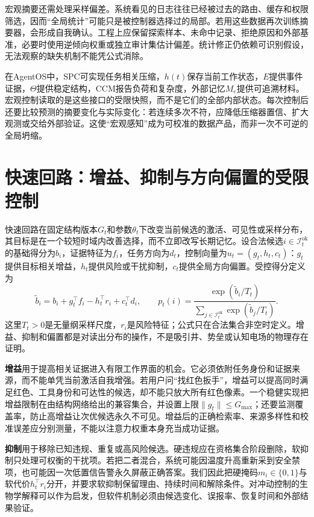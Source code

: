 宏观摘要还需处理采样偏差。系统看见的日志往往已经被过去的路由、缓存和权限筛选，因而“全局统计”可能只是被控制器选择过的局部。若用这些数据再次训练摘要器，会形成自我确认。工程上应保留探索样本、未命中记录、拒绝原因和外部基准，必要时使用逆倾向权重或独立审计集估计偏差。统计修正仍依赖可识别假设，无法观察的缺失机制不能凭公式消除。

在AgentOS中，SPC可实现任务相关压缩，$h(t)$保存当前工作状态，$E$提供事件证据，$\Theta$提供稳定结构，CCM报告负荷和复杂度，外部记忆$M_e$提供可追溯材料。宏观控制读取的是这些接口的受限快照，而不是它们的全部内部状态。每次控制后还要比较预测的摘要变化与实际变化：若连续多次不符，应降低压缩器置信、扩大观测或交给外部验证。这使“宏观感知”成为可校准的数据产品，而非一次不可逆的全局坍缩。

\section{快速回路：增益、抑制与方向偏置的受限控制}
\label{sec:section_7005}

快速回路在固定结构版本$G_t$和参数$\theta_t$下改变当前候选的激活、可见性或采样分布，其目标是在一个较短时域内改善选择，而不立即改写长期记忆。设合法候选$i\in\mathcal{I}^{\mathrm{ok}}_t$的基础得分为$b_i$，证据特征为$f_i$，任务方向为$d_t$，控制向量为$u_t=(g_t,h_t,c_t)$：$g_t$提供目标相关增益，$h_t$提供风险或干扰抑制，$c_t$提供全局方向偏置。受控得分定义为
\[
\tilde b_i=b_i+g_t^{\top}f_i-h_t^{\top}r_i+c_t^{\top}d_i,\qquad
p_t(i)=\frac{\exp(\tilde b_i/T_t)}
{\sum_{j\in\mathcal{I}^{\mathrm{ok}}_t}\exp(\tilde b_j/T_t)} .
\]
这里$T_t>0$是无量纲采样尺度，$r_i$是风险特征；公式只在合法集合非空时定义。增益、抑制和偏置都是对读出分布的操作，不是吸引井、势垒或认知电场的物理存在证明。

\textbf{增益}用于提高相关证据进入有限工作界面的机会。它必须依附任务身份和证据来源，而不能单凭当前激活自我增强。若用户问“找红色扳手”，增益可以提高同时满足红色、工具身份和可达性的候选，却不能只放大所有红色像素。一个稳健实现把增益限制在由结构网络给出的兼容集合，并设置上限$\|g_t\|\le G_{\max}$；还要监测覆盖率，防止高增益让次优候选永久不可见。增益后的正确检索率、来源多样性和校准误差应分别测量，不能以注意力权重本身充当成功证据。

\textbf{抑制}用于移除已知违规、重复或高风险候选。硬违规应在资格集合阶段删除，软抑制只处理可权衡的干扰项。若把二者混合，系统可能因温度升高重新采到安全禁项，也可能因一次低置信告警永久屏蔽正确答案。我们因此把硬掩码$m_i\in\{0,1\}$与软代价$h_t^{\top}r_i$分开，并要求软抑制保留理由、持续时间和解除条件。对冲动控制的生物学解释可以作为启发，但软件机制必须由候选变化、误报率、恢复时间和外部结果验证。

